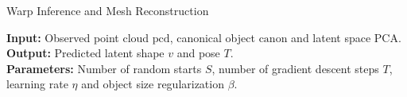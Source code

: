 \begin{algorithm}[H]

\caption{Warp Inference and Mesh Reconstruction}\label{alg:warp_infer} 

\begin{flushleft}
    \hspace*{\algorithmicindent} \textbf{Input:} Observed point cloud $\mathrm{pcd}$, canonical object $\mathrm{canon}$ and latent space $\mathrm{PCA}$. \\
    \hspace*{\algorithmicindent} \textbf{Output:} Predicted latent shape $v$ and pose $T$. \\
    \hspace*{\algorithmicindent} \textbf{Parameters:} Number of random starts $S$, number of gradient descent steps $T$, learning rate $\eta$ and object size regularization $\beta$.
\end{flushleft}

\begin{algorithmic}[1]


\end{algorithmic}
\end{algorithm}

